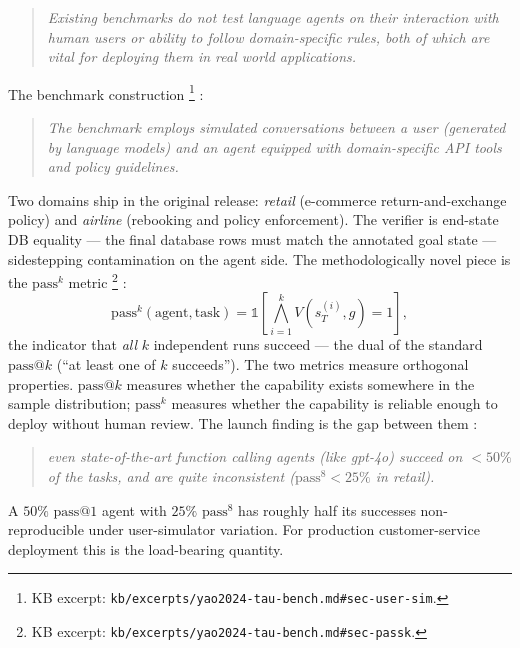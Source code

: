 \begin{quote}\itshape
Existing benchmarks do not test language agents on their interaction
with human users or ability to follow domain-specific rules, both of
which are vital for deploying them in real world applications.
\end{quote}

The benchmark construction%
\footnote{KB excerpt: \texttt{kb/excerpts/yao2024-tau-bench.md\#sec-user-sim}.}
\citep[\S{}sec-user-sim]{yao2024-tau-bench}:

\begin{quote}\itshape
The benchmark employs simulated conversations between a user
(generated by language models) and an agent equipped with
domain-specific API tools and policy guidelines.
\end{quote}

Two domains ship in the original release: \emph{retail} (e-commerce
return-and-exchange policy) and \emph{airline} (rebooking and
policy enforcement). The verifier is end-state DB equality --- the
final database rows must match the annotated goal state ---
sidestepping  contamination on the agent side. The
methodologically novel piece is the $\mathrm{pass}^k$ metric%
\footnote{KB excerpt: \texttt{kb/excerpts/yao2024-tau-bench.md\#sec-passk}.}
\citep[\S{}sec-passk]{yao2024-tau-bench}:
\[
\mathrm{pass}^k(\text{agent}, \text{task}) = \mathbb{1}\!\left[\bigwedge_{i=1}^{k} V(s_T^{(i)}, g) = 1\right],
\]
the indicator that \emph{all} $k$ independent runs succeed --- the
dual of the standard $\mathrm{pass}@k$ (``at least one of $k$
succeeds''). The two metrics measure orthogonal properties.
$\mathrm{pass}@k$ measures whether the capability exists somewhere in
the sample distribution; $\mathrm{pass}^k$ measures whether the
capability is reliable enough to deploy without human review.
The launch finding is the gap between them
\citep[\S{}sec-result]{yao2024-tau-bench}:

\begin{quote}\itshape
even state-of-the-art function calling agents (like gpt-4o) succeed
on $<50\%$ of the tasks, and are quite inconsistent ($\mathrm{pass}^8 < 25\%$
in retail).
\end{quote}

A $50\%$ $\mathrm{pass}@1$ agent with $25\%$ $\mathrm{pass}^8$ has
roughly half its successes non-reproducible under user-simulator
variation. For production customer-service deployment this is the
load-bearing quantity.

